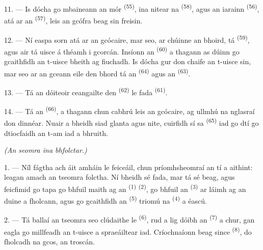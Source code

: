 \VUsaut{4.0mm}
\VUsaut{3.0mm}

11. --- Is dócha go mbaineann an  mór \textsuperscript{(55)}, ina
nitear na  \textsuperscript{(58)}, agus an  iarainn
\textsuperscript{(56)}, atá ar an  \textsuperscript{(57)},
leis an gcófra beag sin freisin.

12. --- Ní easpa sorn atá ar an gcócaire, mar seo, ar chúinne an bhoird, tá
 \textsuperscript{(59)}, agus air tá uisce á théamh i
gcorcán. Insíonn an  \textsuperscript{(60)} a thagann as dúinn go
gcaithfidh an t-uisce bheith ag fiuchadh. Is dócha gur don chaife an t-uisce sin,
mar seo ar an gceann eile den bhord tá an 
\textsuperscript{(64)} agus an  \textsuperscript{(63)}.

13. --- Tá an dóiteoir ceangailte den  \textsuperscript{(62)} le
 fada \textsuperscript{(61)}.

14. --- Tá an  \textsuperscript{(66)}, a thagann chun cabhrú leis
an gcócaire, ag ullmhú na nglasraí don dinnéar. Nuair a bheidh siad glanta agus
nite, cuirfidh sí sa  \textsuperscript{(65)} iad go dtí go dtiocfaidh
an t-am iad a bhruith.

\VUsaut{4.0mm}
{\centering\fontsize{10.2pt}{10.2pt}\selectfont{} \textit{(An seomra ina bhfolctar.)}\par}
\VUsaut{3.0mm}

1. --- Níl fágtha ach áit amháin le feiceáil, chun príomhsheomraí an tí a aithint:
leagan amach an tseomra folctha. Ní bheidh sé fada, mar tá sé beag, agus feicfimid
go tapa go bhfuil  maith ag an 
\textsuperscript{(1)} \textsuperscript{(2)}, go bhfuil an 
\textsuperscript{(3)} ar láimh ag an duine a fholcann, agus go gcaithfidh an
 \textsuperscript{(5)} triomú na 
\textsuperscript{(4)} a éascú.

2. --- Tá ballaí an tseomra seo clúdaithe le 
\textsuperscript{(6)}, rud a lig dóibh an  \textsuperscript{(7)} a
chur, gan eagla go millfeadh an t-uisce a spraeáiltear iad. Críochnaíonn
 beag since \textsuperscript{(8)}, do fholcadh na gcos, an
troscán.
\VUsaut{6.0mm}
\VUfilet{22mm}
